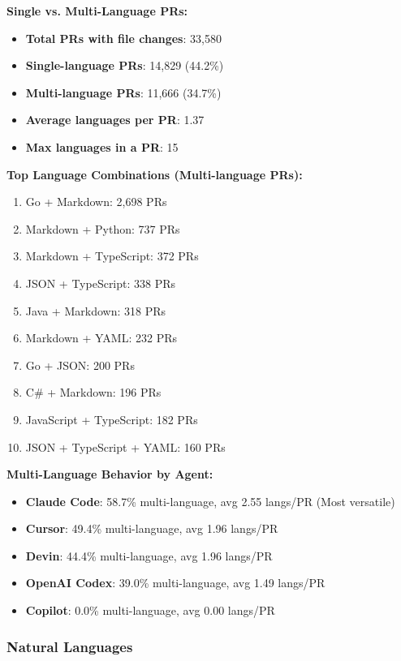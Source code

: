 \documentclass[11pt]{article}
\begin{document}
\textbf{Single vs. Multi-Language PRs:}
\begin{itemize}
    \item \textbf{Total PRs with file changes}: 33,580
    \item \textbf{Single-language PRs}: 14,829 (44.2\%)
    \item \textbf{Multi-language PRs}: 11,666 (34.7\%)
    \item \textbf{Average languages per PR}: 1.37
    \item \textbf{Max languages in a PR}: 15
\end{itemize}

\textbf{Top Language Combinations (Multi-language PRs):}
\begin{enumerate}
    \item Go + Markdown: 2,698 PRs
    \item Markdown + Python: 737 PRs  
    \item Markdown + TypeScript: 372 PRs
    \item JSON + TypeScript: 338 PRs
    \item Java + Markdown: 318 PRs
    \item Markdown + YAML: 232 PRs
    \item Go + JSON: 200 PRs
    \item C\# + Markdown: 196 PRs
    \item JavaScript + TypeScript: 182 PRs
    \item JSON + TypeScript + YAML: 160 PRs
\end{enumerate}

\textbf{Multi-Language Behavior by Agent:}
\begin{itemize}
    \item \textbf{Claude Code}: 58.7\% multi-language, avg 2.55 langs/PR (Most versatile)
    \item \textbf{Cursor}: 49.4\% multi-language, avg 1.96 langs/PR
    \item \textbf{Devin}: 44.4\% multi-language, avg 1.96 langs/PR
    \item \textbf{OpenAI Codex}: 39.0\% multi-language, avg 1.49 langs/PR
    \item \textbf{Copilot}: 0.0\% multi-language, avg 0.00 langs/PR
\end{itemize}

\subsubsection{Natural Languages}
\end{document}

